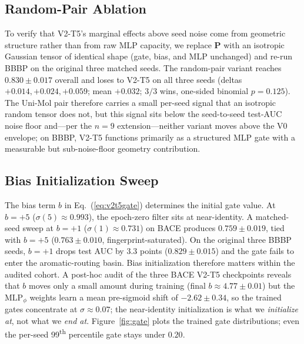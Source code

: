 \subsection{Random-Pair Ablation}
\label{sec:random-pair}
To verify that V2-T5's marginal effects above seed noise come from
geometric structure rather than from raw MLP capacity, we replace
$\mathbf{P}$ with an isotropic Gaussian tensor of identical shape (gate,
bias, and MLP unchanged) and re-run BBBP on the original three matched
seeds. The random-pair variant reaches $0.830 \pm 0.017$ overall and
loses to V2-T5 on all three seeds (deltas $+0.014, +0.024, +0.059$;
mean $+0.032$; $3/3$ wins, one-sided binomial $p{=}0.125$). The Uni-Mol
pair therefore carries a small per-seed signal that an isotropic random
tensor does not, but this signal sits below the seed-to-seed test-AUC
noise floor and---per the $n{=}9$ extension---neither variant moves above
the V0 envelope; on BBBP, V2-T5 functions primarily as a structured MLP
gate with a measurable but sub-noise-floor geometry contribution.

\subsection{Bias Initialization Sweep}
\label{sec:bias-sweep}
The bias term $b$ in Eq.~(\ref{eq:v2t5gate}) determines the initial gate
value. At $b{=}{+}5$ ($\sigma(5)\approx 0.993$), the epoch-zero filter
sits at near-identity. A matched-seed sweep at $b{=}{+}1$
($\sigma(1)\approx 0.731$) on BACE produces $0.759 \pm 0.019$, tied with
$b{=}{+}5$ ($0.763 \pm 0.010$, fingerprint-saturated). On the original
three BBBP seeds, $b{=}{+}1$ drops test AUC by $3.3$ points ($0.829 \pm
0.015$) and the gate fails to enter the aromatic-routing basin. Bias
initialization therefore matters within the audited cohort. A post-hoc
audit of the three BACE V2-T5 checkpoints reveals that $b$ moves only a
small amount during training (final $b\approx 4.77 \pm 0.01$) but the
$\mathrm{MLP}_\phi$ weights learn a mean pre-sigmoid shift of
$-2.62 \pm 0.34$, so the trained gates concentrate at
$\sigma\approx 0.07$; the near-identity initialization is what we
\emph{initialize at}, not what we \emph{end at}. Figure~\ref{fig:gate}
plots the trained gate distributions; even the per-seed 99\textsuperscript{th}
percentile gate stays under $0.20$.

